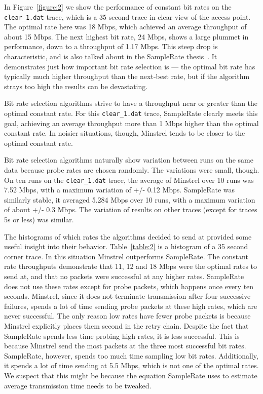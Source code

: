 \documentclass[twocolumn,10pt]{article}
\begin{document}
In Figure~\ref{figure:2} we show the performance of constant bit rates
on the \texttt{clear\_1.dat} trace, which is a 35 second trace in
clear view of the access point.  The optimal rate here was 18 Mbps,
which achieved an average throughput of about 15 Mbps.  The next
highest bit rate, 24 Mbps, shows a large plummet in performance, down
to a throughput of 1.17 Mbps.  This steep drop is characteristic, and
is also talked about in the SampleRate thesis~\cite{samplerate}.  It
demonstrates just how important bit rate selection is --- the optimal
bit rate has typically much higher throughput than the next-best rate,
but if the algorithm strays too high the results can be devastating.

Bit rate selection algorithms strive to have a throughput near or
greater than the optimal constant rate.  For this \verb|clear_1.dat|
trace, SampleRate clearly meets this goal, achieving an average
throughput more than 1 Mbps higher than the optimal constant rate.  In
noisier situations, though, Minstrel tends to be closer to the optimal
constant rate.

Bit rate selection algorithms naturally show variation between runs on
the same data because probe rates are chosen randomly.  The variations
were small, though.  On ten runs on the \texttt{clear\_1.dat} trace,
the average of Minstrel over 10 runs was 7.52 Mbps, with a maximum
variation of +/- 0.12 Mbps.  SampleRate was similarly stable, it
averaged 5.284 Mbps over 10 runs, with a maximum variation of about
+/- 0.3 Mbps.  The variation of results on other traces (except for 
traces 5s or less) was similar.

The histograms of which rates the algorithms decided to send at
provided some useful insight into their behavior.  Table~\ref{table:2}
is a histogram of a 35 second corner trace.  In this situation
Minstrel outperforms SampleRate.  The constant rate throughputs
demonstrate that 11, 12 and 18 Mbps were the optimal rates to send at,
and that no packets were successful at any higher rates.  SampleRate
does not use these rates except for probe packets, which happens once
every ten seconds.  Minstrel, since it does not terminate transmission
after four successive failures, spends a lot of time sending probe
packets at these high rates, which are never successful.  The only
reason low rates have fewer probe packets is because Minstrel
explicitly places them second in the retry chain.
Despite the fact that SampleRate spends less
time probing high rates, it is less successful.  This is because
Minstrel send the most packets at the three most successful bit rates.
SampleRate, however, spends too much time sampling low bit rates.
Additionally, it spends a lot of time sending at 5.5 Mbps, which is not
one of the optimal rates.  We suspect
that this might be because the equation SampleRate uses to estimate
average transmission time needs to be tweaked.
\end{document}
